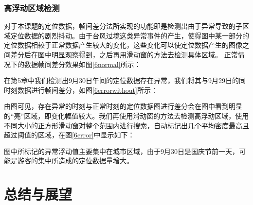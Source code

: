 \documentclass[a4paper,AutoFakeBold,oneside,12pt]{book}
\begin{document}
{{\begin{figure}[!htbp]
\end{figure}


\subsection{高浮动区域检测}
	对于本课题的定位数据，帧间差分法所实现的功能即是检测出由于异常导致的子区域定位数据的剧烈抖动。由于台风过境这类异常事件的产生，使得图中某一部分的定位数据相较于正常数据产生较大的变化，这些变化可以使定位数据产生的图像之间差分后在图中明显观察得到，之后再用滑动窗的方法去检测具体区域。
	正常情况下的数据帧间差分效果如图\ref{6normal}所示：


	在第5章中我们检测出9月30日午间的定位数据存在异常，我们将其与9月29日的同时刻数据进行帧间差分，如图\ref{6errorwithout}所示：


	由图可见，存在异常的时刻与正常时刻的定位数据图进行差分会在图中看到明显的“亮”区域，即变化幅值较大。我们再使用滑动窗的方法去检测高浮动区域，使用不同大小的正方形滑动窗对整个范围内进行搜索，自动标记出几个平均密度最高且超过阈值的区域，在图\ref{6error}中显示如下：


	图中所标记的异常浮动值主要集中在城市区域，由于9月30日是国庆节前一天，可能是游客的集中所造成的定位数据量增大。 

\chapter{总结与展望}


}}
\end{document}
